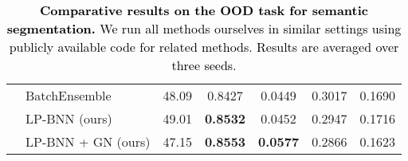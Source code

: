 \documentclass[10pt,twocolumn,letterpaper]{article}
\newcommand{\ab}[1]{\textcolor{black}{#1}}
\begin{document}
\begin{table*}[htbp]
\begin{center}
{\begin{tabular}{c l  c c c c c }
                    & BatchEnsemble  \cite{wen2020batchensemble}  &  48.09  & 0.8427  & 0.0449  & 0.3017  & 0.1690  \\ 
                                  & LP-BNN  (ours)   & {49.01}  &\textbf{0.8532 } & 0.0452  & 0.2947  & 0.1716  \\ 
                                  &LP-BNN + GN (ours)   & 47.15  & \textbf{0.8553}  & \textbf{0.0577}  & 0.2866  & 0.1623 \\ 
\bottomrule
 \end{tabular}
 } \end{center}
 \vspace{-3mm}
 \caption{\ab{\textbf{Comparative results on the OOD task for semantic segmentation.}  We run all methods ourselves in similar settings using publicly available code for related methods. Results are averaged over three seeds.}\label{table:outofditribution}}
 \vspace{-2mm}
 \end{table*}
 
   
\end{document}
